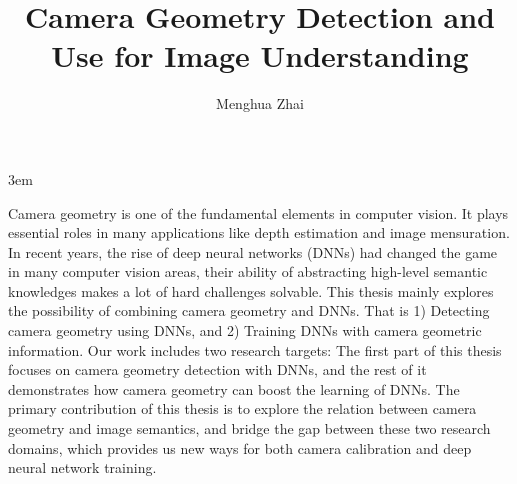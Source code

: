 \documentclass[final]{ukthesis}
\newcommand{\disstitle}{Camera Geometry Detection and Use for Image
Understanding}
\begin{document}
\emergencystretch 3em

\author{Menghua Zhai}
\title{\disstitle}

\abstract
{
  \SingleSpacing
  Camera geometry is one of the fundamental elements in computer vision.
  It plays essential roles in many applications like depth estimation
  and image mensuration. 
  In recent years, the rise of deep neural networks (DNNs) had changed
  the game in many computer vision areas, their ability of abstracting
  high-level semantic knowledges makes a lot of hard challenges
  solvable. 
  This thesis mainly explores the possibility of combining camera
  geometry and DNNs. That is 1) Detecting camera geometry using DNNs,
  and 2) Training DNNs with camera geometric information.  Our work
  includes two research targets: The first part of this thesis focuses
  on camera geometry detection with DNNs, and the rest of it
  demonstrates how camera geometry can boost the learning of DNNs.
  The primary contribution of this thesis is to explore the relation
  between camera geometry and image semantics, and bridge the gap
  between these two research domains, which provides us new ways for
  both camera calibration and deep neural network training.
}


\frontmatter
\maketitle



\tableofcontents\clearpage

\mainmatter


\backmatter




\end{document}
